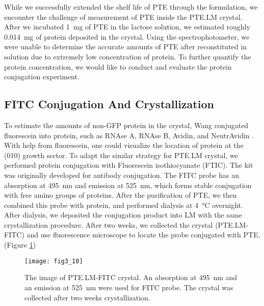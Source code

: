 \begin{refsection}
While we successfully extended the shelf life of PTE through the formulation,
we encounter the challenge of measurement of PTE inside the PTE.LM crystal.
After we incubated \SI{1}{\mg} of PTE in the lactose solution, we estimated
roughly \SI{0.014}{\mg} of protein deposited in the crystal. Using the
spectrophotometer, we were unable to determine the accurate amounts of PTE
after reconstituted in solution due to extremely low concentration of protein.
To further quantify the protein concentration, we would like to conduct and
evaluate the protein conjugation experiment. 

\subsection{FITC Conjugation And Crystallization}

To estimate the amounts of non-GFP protein in the crystal, Wang 
conjugated fluorescein into protein, such as RNAse A, RNAse B, Avidin, and
NeutrAvidin \cite{Wang2001a}. With help from fluorescein, one could visualize
the location of protein at the (010) growth sector. To adapt the similar
strategy for PTE.LM crystal, we performed protein conjugation with Fluorescein
isothiocyanate (FTIC). The kit was originally developed for antibody
conjugation. The FITC probe has an absorption at \SI{495}{\nm} and emission at
\SI{525}{\nm}, which forms stable conjugation with free amino groups of
proteins. After the purification of PTE, we then combined this probe with
protein, and performed dialysis at \SI{4}{\celsius} overnight. After dialysis,
we deposited the conjugation product into LM with the same crystallization
procedure. After two weeks, we collected the crystal (PTE.LM-FITC) and use
fluorescence microscope to locate the probe conjugated with PTE. (Figure
\ref{fig:ptelm-fitc})
\begin{figure}[htbp] \centering \texttt{[image: fig3\_10]} 
    \caption[The image of PTE.LM-FITC crystal. An absorption at \SI{495}{\nm}
    and an emission at \SI{525}{\nm} were used for FITC probe. The crystal was
collected after two weeks crystallization.]{The image of PTE.LM-FITC crystal.
    An absorption at \SI{495}{\nm} and an emission at \SI{525}{\nm} were used
for FITC probe. The crystal was collected after two weeks crystallization.}
\label{fig:ptelm-fitc} 
\end{figure}


\end{refsection}
